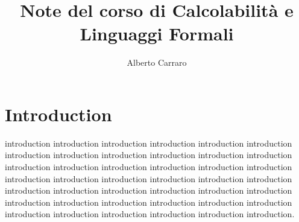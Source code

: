 \documentclass[runningheads,a4paper]{llncs}
\begin{document}
\mainmatter  %

\title{Note del corso di Calcolabilit\`{a} e Linguaggi Formali}


%
%
\author{Alberto Carraro}
%


%
%




\maketitle
\tableofcontents

\section{Introduction}

introduction introduction introduction introduction introduction introduction introduction introduction introduction introduction introduction introduction introduction introduction introduction introduction introduction introduction introduction introduction introduction introduction introduction introduction introduction introduction introduction introduction introduction introduction introduction introduction introduction introduction introduction introduction introduction introduction introduction introduction introduction introduction.




%
\end{document}
